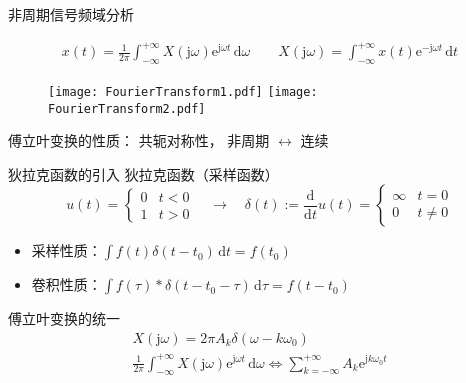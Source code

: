 \documentclass[UTF8]{ctexbeamer}
\begin{document}
\begin{frame}{非周期信号频域分析}
    \begin{tcolorbox}[top=0mm,
        title = 傅立叶变换（Fourier Transform）,
        boxrule = 0.3pt,
        fontupper = \normalcolor\small]
        \begin{gather*}
            x(t) = \frac{1}{2\pi} \int_{-\infty}^{+\infty} X(\mathrm{j}\omega) \mathrm{e}^{\mathrm{j}\omega t}\,\mathrm{d}\omega 
            \qquad
            X(\mathrm{j}\omega) = \int_{-\infty}^{+\infty} x(t) \mathrm{e}^{-\mathrm{j}\omega t}\,\mathrm{d}t 
        \end{gather*}
    \end{tcolorbox}
    
    \begin{figure}
        \centering
        \texttt{[image: FourierTransform1.pdf]}
        \hspace{20pt}
        \texttt{[image: FourierTransform2.pdf]}
    \end{figure}

    傅立叶变换的性质：
    共轭对称性， 
    非周期 $\leftrightarrow$ 连续
\end{frame}



\begin{frame}{狄拉克函数的引入}
    狄拉克函数（采样函数）
    \begin{equation*}
        u(t) = \left\{\begin{array}{cl}
            0 & t < 0 \\
            1 & t > 0
        \end{array}\right.
        \quad \rightarrow \quad
        \delta (t) := \frac{\mathrm{d}}{\mathrm{d}t} u(t) = \left\{\begin{array}{cl}
            \infty & t = 0 \\
            0 & t \ne 0
        \end{array}\right. 
    \end{equation*}

    \begin{itemize}
        \item 采样性质：$\int f(t) \delta (t-t_0) \, \mathrm{d} t = f(t_0)$
        \item 卷积性质：$\int f(\tau) \ast \delta (t-t_0-\tau) \, \mathrm{d} \tau = f(t-t_0)$
    \end{itemize}

    傅立叶变换的统一
    \begin{gather*}
        X(\mathrm{j}\omega) = 2 \pi A_k \delta (\omega - k\omega_0)\\
        \frac{1}{2\pi} \int_{-\infty}^{+\infty} X(\mathrm{j}\omega) \mathrm{e}^{\mathrm{j}\omega t}\,\mathrm{d}\omega 
        \Leftrightarrow  \sum_{k=-\infty}^{+\infty} A_k \mathrm{e}^{\mathrm{j}k\omega_0t}  
    \end{gather*}
\end{frame}
\end{document}
